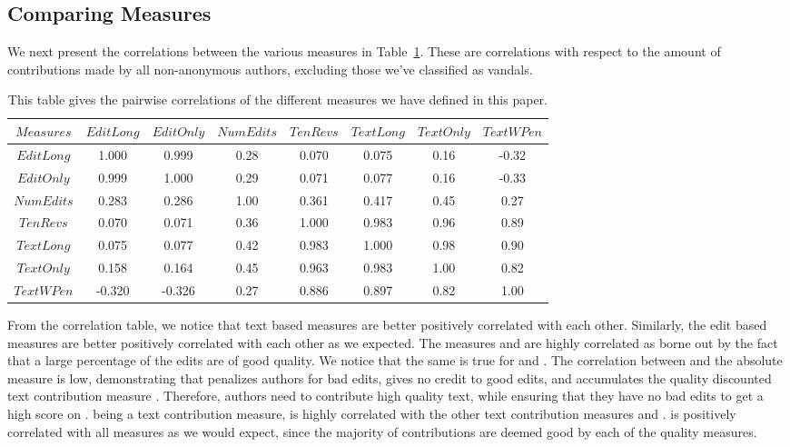 \pagebreak
\subsection{Comparing Measures}

We next present the correlations between the various measures
in Table~\ref{cor-tab}.
These are correlations with respect to the amount of contributions
made by all non-anonymous authors, excluding those we've classified
as vandals.  
%
\begin{table}
\begin{center}
\begin{tabular}{|c||c|c|c|c|c|c|c|}
	\hline
$Measures$ &  $EditLong$ & $EditOnly$ & $NumEdits$ & $TenRevs$ & $TextLong$ & $TextOnly$ & $TextWPen$ \\
        \hline \hline
$EditLong$         &  1.000  & 0.999  &  0.28  &         0.070  & 0.075  &  0.16  & -0.32 \\
$EditOnly$         &  0.999  & 1.000  &  0.29  &         0.071  & 0.077  &  0.16  & -0.33 \\
$NumEdits$         &  0.283  & 0.286  &  1.00  &         0.361  & 0.417  &  0.45  &  0.27 \\
$TenRevs$          &  0.070  & 0.071  &  0.36  &         1.000  & 0.983  &  0.96  &  0.89 \\
$TextLong$         &  0.075  & 0.077  &  0.42  &         0.983  & 1.000  &  0.98  &  0.90 \\
$TextOnly$         &  0.158  & 0.164  &  0.45  &         0.963  & 0.983  &  1.00  &  0.82 \\
$TextWPen$         & -0.320  &-0.326  &  0.27  &         0.886  & 0.897  &  0.82  &  1.00 \\
        \hline
\end{tabular}
\end{center}
\caption[Correlations of our measures]{
This table gives the pairwise correlations of the different measures we 
have defined in this paper.
}\label{cor-tab}
\end{table}
%
From the correlation table, we notice that text based measures are
better positively correlated with each other.
Similarly, the edit based measures are better positively correlated 
with each other as we expected.
The measures \editlong and \editonly are highly correlated as 
borne out by the fact that a large percentage of the edits are of
good quality.
We notice that the same is true for \textlong and \textonly.
The correlation between \punish and the absolute measure
\editonly is low, demonstrating that \punish
penalizes authors for bad edits, gives no credit to good edits,
and accumulates the quality discounted text contribution measure 
\textlong.
Therefore, authors need to contribute high quality text, while
ensuring that they have no bad edits to get a high score on
\punish.
\tenrevs being a text contribution measure, is highly correlated
with the other text contribution measures \textonly and
\textlong.
\numedits is positively correlated with all measures as we would
expect, since the majority of contributions are deemed good by
each of the quality measures.

